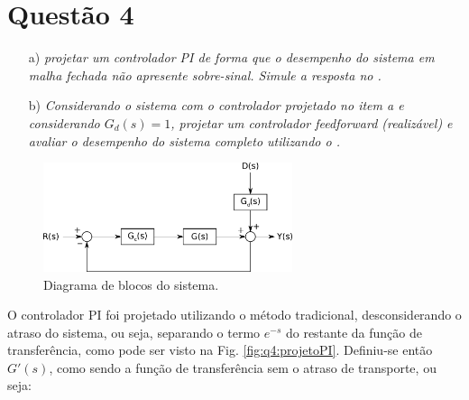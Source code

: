 

  \chapter*{Questão 4}

\begin{itemize}
    \item[a)] {\it projetar um controlador PI de forma que o desempenho do
              sistema em malha fechada não apresente sobre-sinal. Simule a 
              resposta no \Matlab.}
    \item[b)] {\it Considerando o sistema com o controlador projetado no item a
              e considerando $G_d(s) = 1$, projetar um controlador feedforward 
              (realizável) e avaliar o desempenho do sistema completo utilizando
              o \Matlab.}
\end{itemize}

\begin{figure}[H]
\centering
    \includegraphics[width=0.65\textwidth]{imgs/questao4/sistema}
    \caption{Diagrama de blocos do sistema.}
    \label{fig:q4:sist}
\end{figure}

\vspace{0.5cm}


\vspace{0.25cm}

O controlador PI foi projetado utilizando o método tradicional, desconsiderando
o atraso do sistema, ou seja, separando o termo $e^{-s}$ do restante da função
de transferência, como pode ser visto na Fig. \ref{fig:q4:projetoPI}.
Definiu-se então $G'(s)$, como sendo a função de transferência sem o atraso de
transporte, ou seja:

